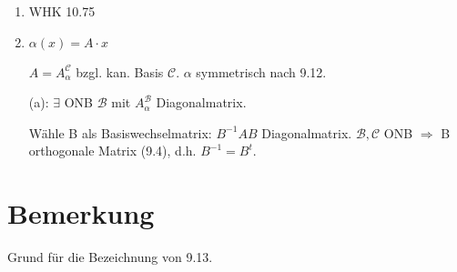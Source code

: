 \documentclass[a4paper, openany]{book}
\begin{document}
        \begin{enumerate}[label=(\alph*)]
          \item WHK 10.75

          \item $\alpha(x) = A \cdot x$

          $A = A_{\alpha}^{\mathcal{C}}$ bzgl. kan. Basis $\mathcal{C}$. $\alpha$ symmetrisch nach 9.12.

          (a): $\exists$ ONB $\mathcal{B}$ mit $A_{\alpha}^{\mathcal{B}}$ Diagonalmatrix. 

          \par \medskip

          Wähle B als Basiswechselmatrix: $B^{-1} A B$ Diagonalmatrix. $\mathcal{B}, \mathcal{C}$ ONB $\Rightarrow$ B orthogonale Matrix (9.4), d.h. $B^{-1} = B^t$.
        \end{enumerate}

        \section{Bemerkung}

        Grund für die Bezeichnung von 9.13.
\end{document}
